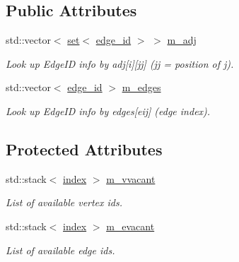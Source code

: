 \subsection*{Public Attributes}
\begin{DoxyCompactItemize}
\item 
\hypertarget{classmerlin_1_1graph_a71cf7768aa72159f3ae7b52ef6b23993}{}std\+::vector$<$ \hyperlink{classmerlin_1_1set}{set}$<$ \hyperlink{structmerlin_1_1edge__id}{edge\+\_\+id} $>$ $>$ \hyperlink{classmerlin_1_1graph_a71cf7768aa72159f3ae7b52ef6b23993}{m\+\_\+adj}\label{classmerlin_1_1graph_a71cf7768aa72159f3ae7b52ef6b23993}

\begin{DoxyCompactList}\small\item\em Look up Edge\+I\+D info by adj\mbox{[}i\mbox{]}\mbox{[}jj\mbox{]} (jj = position of j). \end{DoxyCompactList}\item 
\hypertarget{classmerlin_1_1graph_a6ff5b1d6713ff82d50f9888f2b60390f}{}std\+::vector$<$ \hyperlink{structmerlin_1_1edge__id}{edge\+\_\+id} $>$ \hyperlink{classmerlin_1_1graph_a6ff5b1d6713ff82d50f9888f2b60390f}{m\+\_\+edges}\label{classmerlin_1_1graph_a6ff5b1d6713ff82d50f9888f2b60390f}

\begin{DoxyCompactList}\small\item\em Look up Edge\+I\+D info by edges\mbox{[}eij\mbox{]} (edge index). \end{DoxyCompactList}\end{DoxyCompactItemize}
\subsection*{Protected Attributes}
\begin{DoxyCompactItemize}
\item 
\hypertarget{classmerlin_1_1graph_a6b3ab6e44183a8b27bb04f93166fbffb}{}std\+::stack$<$ \hyperlink{classmerlin_1_1graph_a5cade38832f47248573e921276f122d6}{index} $>$ \hyperlink{classmerlin_1_1graph_a6b3ab6e44183a8b27bb04f93166fbffb}{m\+\_\+vvacant}\label{classmerlin_1_1graph_a6b3ab6e44183a8b27bb04f93166fbffb}

\begin{DoxyCompactList}\small\item\em List of available vertex ids. \end{DoxyCompactList}\item 
\hypertarget{classmerlin_1_1graph_a9ebdd8a3cfe95f6159759c41836bf495}{}std\+::stack$<$ \hyperlink{classmerlin_1_1graph_a5cade38832f47248573e921276f122d6}{index} $>$ \hyperlink{classmerlin_1_1graph_a9ebdd8a3cfe95f6159759c41836bf495}{m\+\_\+evacant}\label{classmerlin_1_1graph_a9ebdd8a3cfe95f6159759c41836bf495}

\begin{DoxyCompactList}\small\item\em List of available edge ids. \end{DoxyCompactList}\end{DoxyCompactItemize}


